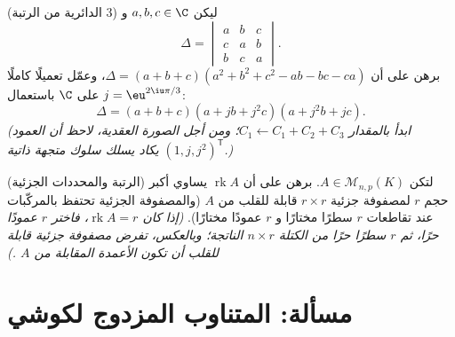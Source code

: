 \begin{exercise}[$\star\star$]\label{exo:b1:det:11}
(الدائرية من الرتبة $3$) ليكن $a, b, c \in \C$ و
\[
\Delta = \begin{vmatrix}
a & b & c\\
c & a & b\\
b & c & a
\end{vmatrix}.
\]
برهن على أن $\Delta = (a + b + c)(a^2 + b^2 + c^2 - ab - bc -
ca)$، وعمّل تعميلًا كاملًا على $\C$ باستعمال $j =
\eu^{2\iu\pi/3}$:
\[
\Delta = (a + b + c)(a + jb + j^2c)(a + j^2b + jc) .
\]
\emph{(ابدأ بالمقدار $C_1 \leftarrow C_1 + C_2 + C_3$؛ ومن أجل
الصورة العقدية، لاحظ أن العمود $(1, j, j^2)^{\mathsf T}$
يكاد يسلك سلوك متجهة ذاتية.)}
\end{exercise}

\begin{exercise}[$\star\star\star$]\label{exo:b1:det:12}
(الرتبة والمحددات الجزئية) لتكن $A \in \mathcal{M}_{n,p}(K)$. برهن على أن
$\operatorname{rk} A$ يساوي أكبر حجم $r$ لمصفوفة جزئية
$r \times r$ قابلة للقلب من $A$ (والمصفوفة الجزئية تحتفظ
بالمركّبات عند تقاطعات $r$ سطرًا مختارًا و $r$ عمودًا
مختارًا). \emph{(إذا كان $\operatorname{rk} A = r$، فاختر $r$ عمودًا
حرًا، ثم $r$ سطرًا حرًا من الكتلة $n \times r$ الناتجة؛
وبالعكس، تفرض مصفوفة جزئية قابلة للقلب أن تكون الأعمدة
المقابلة من $A$ .)}
\end{exercise}

\section{مسألة: المتناوب المزدوج لكوشي}


